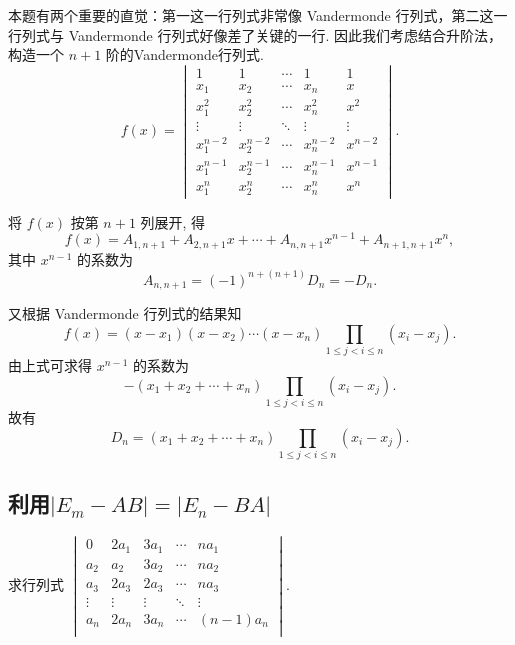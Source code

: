 \begin{solution}
    本题有两个重要的直觉：第一这一行列式非常像 Vandermonde 行列式，第二这一行列式与 Vandermonde 行列式好像差了关键的一行. 因此我们考虑结合升阶法，构造一个 $n+1$ 阶的Vandermonde行列式.
    \[ f(x)=\begin{vmatrix}
            1         & 1         & \cdots & 1         & 1       \\
            x_1       & x_2       & \cdots & x_n       & x       \\
            x_1^{2}   & x_2^{2}   & \cdots & x_n^{2}   & x^{2}   \\
            \vdots    & \vdots    & \ddots & \vdots    & \vdots  \\
            x_1^{n-2} & x_2^{n-2} & \cdots & x_n^{n-2} & x^{n-2} \\
            x_1^{n-1} & x_2^{n-1} & \cdots & x_n^{n-1} & x^{n-1} \\
            x_1^{n}   & x_2^{n}   & \cdots & x_n^{n}   & x^{n}
        \end{vmatrix}. \]

    将 $f(x)$ 按第 $n+1$ 列展开, 得
    \[ f(x)=A_{1, n+1}+A_{2, n+1} x+\cdots+A_{n, n+1} x^{n-1}+A_{n+1, n+1} x^{n}, \]
    其中 $x^{n-1}$ 的系数为
    \[ A_{n, n+1}=(-1)^{n+(n+1)} D_n=-D_n. \]

    又根据 Vandermonde 行列式的结果知
    \[ f(x)=(x-x_1)(x-x_2)\cdots(x-x_n) \prod_{1 \leqslant j<i \leqslant n}(x_i-x_j). \]
    由上式可求得 $x^{n-1}$ 的系数为
    \[ -(x_1+x_2+\cdots+x_n) \prod_{1 \leqslant j<i \leqslant n}(x_i-x_j). \]
    故有
    \[ D_n=(x_1+x_2+\cdots+x_n) \prod_{1 \leqslant j<i \leqslant n}(x_i-x_j). \]
\end{solution}

\subsection{利用$|E_m-AB|=|E_n-BA|$} \label{sec:利用|E_m-AB|=|E_n-BA|}

\begin{example}{}{}
    求行列式 $\begin{vmatrix}
            0      & 2a_1   & 3a_1   & \cdots & na_1     \\
            a_2    & a_2    & 3a_2   & \cdots & na_2     \\
            a_3    & 2a_3   & 2a_3   & \cdots & na_3     \\
            \vdots & \vdots & \vdots & \ddots & \vdots   \\
            a_n    & 2a_n   & 3a_n   & \cdots & (n-1)a_n \\
        \end{vmatrix}$.
\end{example}

